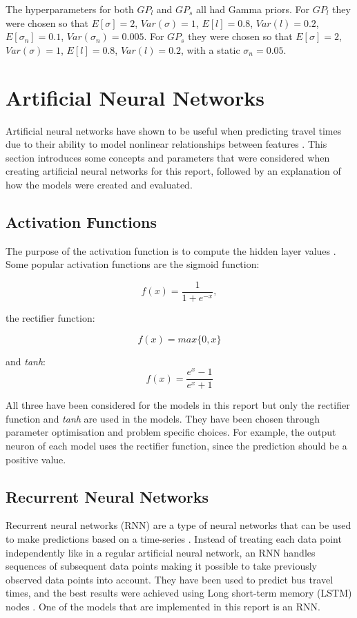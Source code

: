 \noindent
The hyperparameters for both $GP_l$ and $GP_s$ all had Gamma
priors. For $GP_l$ they were chosen so that $E[\sigma] = 2$,
$Var(\sigma) = 1$, $E[l] = 0.8$, $Var(l) = 0.2$, $E[\sigma_n] = 0.1$,
$Var(\sigma_n) = 0.005$. For $GP_s$ they were chosen so that $E[\sigma] = 2$,
$Var(\sigma) = 1$, $E[l] = 0.8$, $Var(l) = 0.2$, with a static
$\sigma_n = 0.05$. 

\section{Artificial Neural Networks}

Artificial neural networks have shown to be useful when predicting travel times due to their ability to model nonlinear relationships between features \cite{brazilANN, malaysiaANN}. This section introduces some concepts and parameters that were considered when creating artificial neural networks for this report, followed by an explanation of how the models were created and evaluated.

\subsection{Activation Functions}
The purpose of the activation function is to compute the hidden layer values \cite{Goodfellow-et-al-2016}. Some popular activation functions are the sigmoid function:

\begin{equation} 
f(x) = \frac{1}{1+e^{-x}},
\end{equation}

the rectifier function:

\begin{equation} 
f(x) = max\{0,x\}
\end{equation}

and \textit{tanh}:
\begin{equation} 
f(x) =  \frac{e^x-1}{e^{x}+1} 
\end{equation}

All three have been considered for the models in this report but only the rectifier function and \textit{tanh} are used in the models. They have been chosen through parameter optimisation and problem specific choices. For example, the output neuron of each model uses the rectifier function, since the prediction should be a positive value.

\subsection{Recurrent Neural Networks}
Recurrent neural networks (RNN) are a type of neural networks that can be used to make predictions based on a time-series \cite{RNN}. Instead of treating each data point independently like in a regular artificial neural network, an RNN handles sequences of subsequent data points making it possible to take previously observed data points into account. They have been used to predict bus travel times, and the best results were achieved using Long short-term memory (LSTM) nodes \cite{RNNBusPredictions}. One of the models that are implemented in this report is an RNN. 


